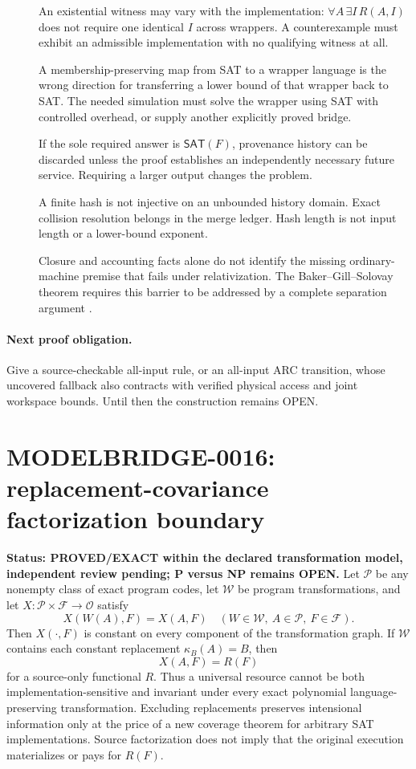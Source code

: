 \documentclass[11pt]{article}
\newcommand{\SAT}{\mathsf{SAT}}
\begin{document}
\begin{description}
\item[] An existential witness may vary with the implementation:
$\forall A\,\exists I\,R(A,I)$ does not require one identical $I$ across
wrappers. A counterexample must exhibit an admissible implementation with
no qualifying witness at all.
\item[] A membership-preserving map from SAT to a wrapper language is the
wrong direction for transferring a lower bound of that wrapper back to
SAT. The needed simulation must solve the wrapper using SAT with controlled
overhead, or supply another explicitly proved bridge.
\item[] If the sole required answer is $\SAT(F)$, provenance history can
be discarded unless the proof establishes an independently necessary
future service. Requiring a larger output changes the problem.
\item[] A finite hash is not injective on an unbounded history domain.
Exact collision resolution belongs in the merge ledger. Hash length is
not input length or a lower-bound exponent.
\item[] Closure and accounting facts alone do not identify the missing
ordinary-machine premise that fails under relativization. The
Baker--Gill--Solovay theorem requires this barrier to be addressed by a
complete separation argument \cite{bgs}.
\end{description}

\paragraph{Next proof obligation.}
Give a source-checkable all-input rule, or an all-input ARC transition,
whose uncovered fallback also contracts with verified physical access and
joint workspace bounds. Until then the construction remains OPEN.

\section{MODELBRIDGE-0016: replacement-covariance factorization boundary}
\textbf{Status: PROVED/EXACT within the declared transformation model, independent review pending; P versus NP remains OPEN.}
Let \(\mathcal P\) be any nonempty class of exact program codes, let
\(\mathcal W\) be program transformations, and let
\(X:\mathcal P\times\mathcal F\to\mathcal O\) satisfy
\[
 X(W(A),F)=X(A,F)
 \quad(W\in\mathcal W,\ A\in\mathcal P,\ F\in\mathcal F).
\]
Then \(X(\cdot,F)\) is constant on every component of the transformation
graph. If \(\mathcal W\) contains each constant replacement
\(\kappa_B(A)=B\), then
\[
 X(A,F)=R(F)
\]
for a source-only functional \(R\). Thus a universal resource cannot be both
implementation-sensitive and invariant under every exact polynomial
language-preserving transformation. Excluding replacements preserves
intensional information only at the price of a new coverage theorem for
arbitrary SAT implementations. Source factorization does not imply that the
original execution materializes or pays for \(R(F)\).
\end{document}
